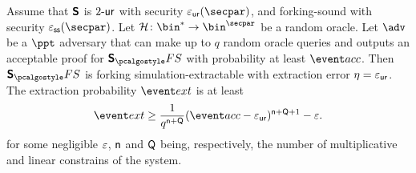 \documentclass[runningheads,10pt]{llncs}
\begin{document}
\begin{corollary}
  \label{thm:sonicprotfs_se}
  Assume that $\bm{\mathsf{S}}$ is ${2\text{-}\mathsf{ur}}$ with security $\epsur(\secpar)$, and
  forking-sound with security $\epsss(\secpar)$. Let $\ro\colon
  \bin^* \to \bin^\secpar$ be a random oracle. Let $\advse$ be a $\ppt$
  adversary that can make up to $q$ random oracle queries and outputs an
  acceptable proof for $\sonicprotfs$ with probability at least $\accProb$. Then
  $\sonicprotfs$ is forking simulation-extractable with extraction error $\eta =
  \varepsilon_{\mathsf{ur}}$. The extraction probability $\extProb$ is at least
\[
		\extProb  \geq \frac{1}{q^{\multconstr + \linconstr}} (\accProb - \epsur)^{\multconstr +
		\linconstr + 1} - \eps.
	\]
	for some negligible $\varepsilon$, $\mathsf{n}$ and $\mathsf{Q}$ being,
  respectively, the number of multiplicative and linear constrains of the system.
\end{corollary}


\end{document}
